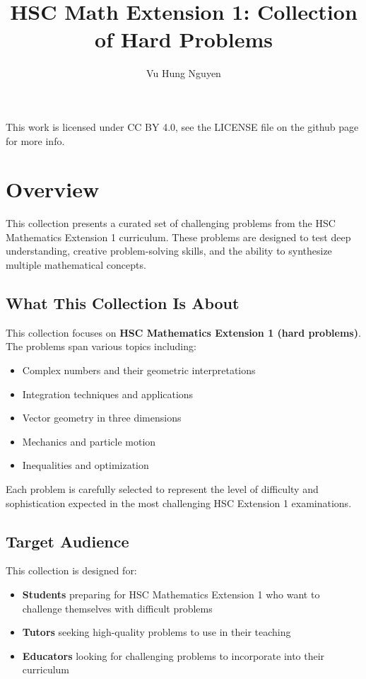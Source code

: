 \documentclass[12pt]{article}
\author{Vu Hung Nguyen}
\title{HSC Math Extension 1: Collection of Hard Problems}
\date{}
\begin{document}
\maketitle

\begingroup\small\noindent This work is licensed under CC BY 4.0, see the LICENSE file on the github page for more info.\par\endgroup

\section{Overview}

This collection presents a curated set of challenging problems from the HSC Mathematics Extension 1 curriculum. These problems are designed to test deep understanding, creative problem-solving skills, and the ability to synthesize multiple mathematical concepts.

\subsection{What This Collection Is About}

This collection focuses on \textbf{HSC Mathematics Extension 1 (hard problems)}. The problems span various topics including:
\begin{itemize}
    \item Complex numbers and their geometric interpretations
    \item Integration techniques and applications
    \item Vector geometry in three dimensions
    \item Mechanics and particle motion
    \item Inequalities and optimization
\end{itemize}

Each problem is carefully selected to represent the level of difficulty and sophistication expected in the most challenging HSC Extension 1 examinations.

\subsection{Target Audience}

This collection is designed for:
\begin{itemize}
    \item \textbf{Students} preparing for HSC Mathematics Extension 1 who want to challenge themselves with difficult problems
    \item \textbf{Tutors} seeking high-quality problems to use in their teaching
    \item \textbf{Educators} looking for challenging problems to incorporate into their curriculum
\end{itemize}
\end{document}
